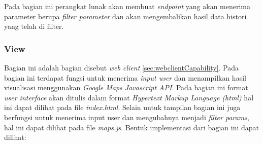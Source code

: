 Pada bagian ini perangkat lunak akan membuat \textit{endpoint} yang akan menerima parameter berupa \textit{filter parameter} dan akan mengembalikan hasil data histori yang telah di filter.

\subsubsection{View}
Bagian ini adalah bagian disebut \textit{web client} \ref{sec:webclientCapability}. Pada bagian ini terdapat fungsi untuk menerima \textit{input user} dan menampilkan hasil visualisasi menggunakan \textit{Google Maps Javascript API}. Pada bagian ini format \textit{user interface} akan ditulis dalam  format \textit{Hypertext Markup Language (html)} hal ini dapat dilihat pada file \textit{index.html}.
Selain untuk tampilan bagian ini juga berfungsi untuk menerima input user dan mengubahnya menjadi \textit{filter params}, hal ini dapat dilihat pada file \textit{maps.js}. Bentuk implementasi dari bagian ini dapat dilihat:

